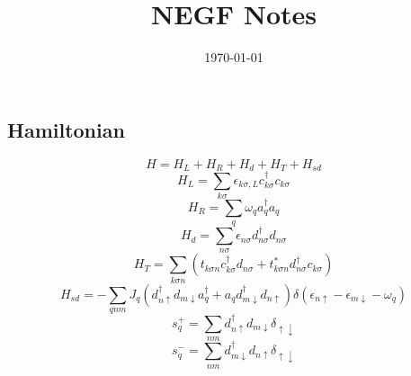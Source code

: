 \documentclass[11pt,a4paper]{article}
\begin{document}
\title{NEGF Notes}
\date{\today}
\maketitle


\subsection{Hamiltonian}
\begin{equation}
H=H_{L}+H_{R}+H_{d}+H_{T}+H_{s d}
\end{equation}
\begin{equation}
H_{L}=\sum_{k \sigma} \epsilon_{k \sigma, L} c_{k \sigma}^{\dagger} c_{k \sigma}
\end{equation}
\begin{equation}
H_{R}=\sum_{q} \omega_{q} a_{q}^{\dagger} a_{q}
\end{equation}
\begin{equation}
H_{d}=\sum_{n \sigma} \epsilon_{n \sigma} d_{n \sigma}^{\dagger} d_{n \sigma}
\end{equation}
\begin{equation}
H_{T}=\sum_{k \sigma n}\left(t_{k \sigma n} c_{k \sigma}^{\dagger} d_{n \sigma}+t_{k \sigma n}^{*} d_{n \sigma}^{\dagger} c_{k \sigma}\right)
\end{equation}
\begin{equation}
H_{s d}=-\sum_{q n m} J_{q}\left(d_{n \uparrow}^{\dagger} d_{m \downarrow} a_{q}^{\dagger}+a_{q} d_{m \downarrow}^{\dagger} d_{n \uparrow}\right) \delta\left(\epsilon_{n \uparrow}-\epsilon_{m \downarrow}-\omega_{q}\right)
\end{equation}
\begin{equation}
s_{q}^{+}=\sum_{n m} d_{n \uparrow}^{\dagger} d_{m \downarrow} \delta_{\uparrow \downarrow}
\end{equation}
\begin{equation}
s_{q}^{-}=\sum_{n m} d_{m \downarrow}^{\dagger} d_{n \uparrow} \delta_{\uparrow \downarrow}
\end{equation}
\end{document}
